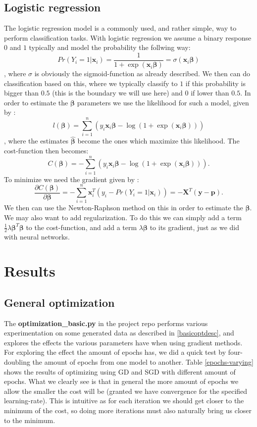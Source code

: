 \documentclass{article}
\begin{document}
\subsection{Logistic regression}
The logistic regression model is a commonly used, and rather simple, way to
perform classification tasks. With logistic regression we assume a binary
response $0$ and $1$ typically and model the probability the follwing way:
$$Pr(Y_i = 1 | \bm{x}_i) = \frac{1}{1 + \exp(\bm{x}_i \bm{\beta})} = \sigma(\bm{x}_i \bm{\beta})$$
, where $\sigma$ is obviously the sigmoid-function as already described. We then
can do classification based on this, where we typically classify to $1$ if this
probability is bigger than $0.5$ (this is the boundary we will use here) and $0$
if lower than $0.5$. In order to estimate the $\bm{\beta}$ parameters we use the
likelihood for such a model, given by \cite[s.~4.4]{hastie2009elements}:
$$l(\bm{\beta}) = \sum_{i=1}^{n} (y_i \bm{x}_i \bm{\beta} - \log(1 + \exp(\bm{x}_i \bm{\beta})))$$
, where the estimates $\hat{\bm{\beta}}$ become the ones which maximize this
likelihood. The cost-function then becomes:
$$C(\bm{\beta}) = -\sum_{i=1}^{n} (y_i \bm{x}_i \bm{\beta} - \log(1 + \exp(\bm{x}_i \bm{\beta}))).$$
To minimize we need the gradient given by \cite[s.~4.4]{hastie2009elements}:
$$\frac{\partial C(\bm{\beta})}{\partial \bm{\beta}} = -\sum_{i=1}^{n}\bm{x}_i^T(y_i - Pr(Y_i = 1 | \bm{x}_i)) = -\bm{X}^T(\bm{y} - \bm{p}).$$
We then can use the Newton-Raphson method on this in order to estimate the $\bm{\beta}$.
\\

We may also want to add regularization. To do this we can simply add a term
$\frac{1}{2}\lambda \bm{\beta}^T \bm{\beta}$ to the cost-function, and add a term
$\lambda \bm{\beta}$ to its gradient, just as we did with neural networks.

\section{Results}

\subsection{General optimization}
The \textbf{optimization\_basic.py} in the project repo
\cite{githubrepoproject2code} performs various experimentation on some generated
data as described in \ref{basicoptdesc}, and explores the effects the
various parameters have when using gradient methods. For exploring the effect
the amount of epochs has, we did a quick test by four-doubling the amount of
epochs from one model to another. Table \ref{epochs-varying} shows the results
of optimizing using GD and SGD with different amount of epochs. What we clearly
see is that in general the more amount of epochs we allow the smaller the cost
will be (granted we have convergence for the specified learning-rate). This is intuitive
as for each iteration we should get closer to the minimum of the cost, so doing
more iterations must also naturally bring us closer to the minimum.
\end{document}
